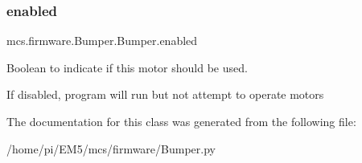 \subsubsection{\texorpdfstring{enabled}{enabled}}
{\footnotesize\ttfamily mcs.\+firmware.\+Bumper.\+Bumper.\+enabled}



Boolean to indicate if this motor should be used. 

If disabled, program will run but not attempt to operate motors 

The documentation for this class was generated from the following file\+:\begin{DoxyCompactItemize}
\item 
/home/pi/\+E\+M5/mcs/firmware/Bumper.\+py\end{DoxyCompactItemize}
